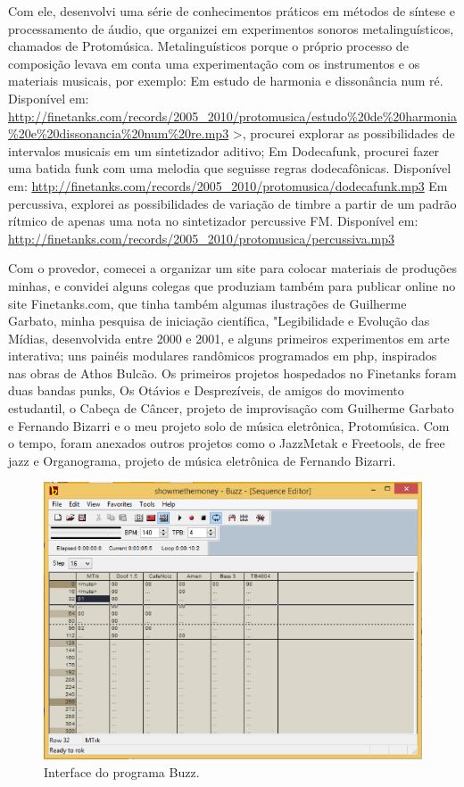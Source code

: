 Com ele, desenvolvi uma série de conhecimentos práticos em métodos de síntese e processamento de áudio, que organizei em experimentos sonoros metalinguísticos, chamados de Protomúsica. Metalinguísticos porque o próprio processo de composição levava em conta uma experimentação com os instrumentos e os materiais musicais, por exemplo:
Em estudo de harmonia e dissonância num ré. Disponível em: \url{http://finetanks.com/records/2005_2010/protomusica/estudo\%20de\%20harmonia\%20e\%20dissonancia\%20num\%20re.mp3} >, procurei explorar as possibilidades de intervalos musicais em um sintetizador aditivo;
Em Dodecafunk, procurei fazer uma batida funk com uma melodia que seguisse regras dodecafônicas. Disponível em: \url{http://finetanks.com/records/2005_2010/protomusica/dodecafunk.mp3}
Em percussiva, explorei as possibilidades de variação de timbre a partir de um padrão rítmico de apenas uma nota no sintetizador percussive FM. Disponível em: \url{http://finetanks.com/records/2005_2010/protomusica/percussiva.mp3}

Com o provedor, comecei a organizar um site para colocar materiais de produções minhas, e convidei alguns colegas que produziam também para publicar online no site Finetanks.com, que tinha também algumas ilustrações de Guilherme Garbato, minha pesquisa de iniciação científica, "Legibilidade e Evolução das Mídias, desenvolvida entre 2000 e 2001, e alguns primeiros experimentos em arte interativa; uns painéis modulares randômicos programados em php, inspirados nas obras de Athos Bulcão.  
Os primeiros projetos hospedados no Finetanks foram duas bandas punks, Os Otávios e Desprezíveis, de amigos do movimento estudantil, o Cabeça de Câncer, projeto de improvisação com Guilherme Garbato e Fernando Bizarri e o meu projeto solo de música eletrônica, Protomúsica. Com o tempo, foram anexados outros projetos como o JazzMetak e Freetools, de free jazz e Organograma, projeto de música eletrônica de Fernando Bizarri.

\begin{figure}
\centering
\includegraphics[width=1\textwidth]{pictures/cap1/buzz3}
\caption{Interface do programa Buzz.}
\label{fig:buzz3}
\end{figure}


